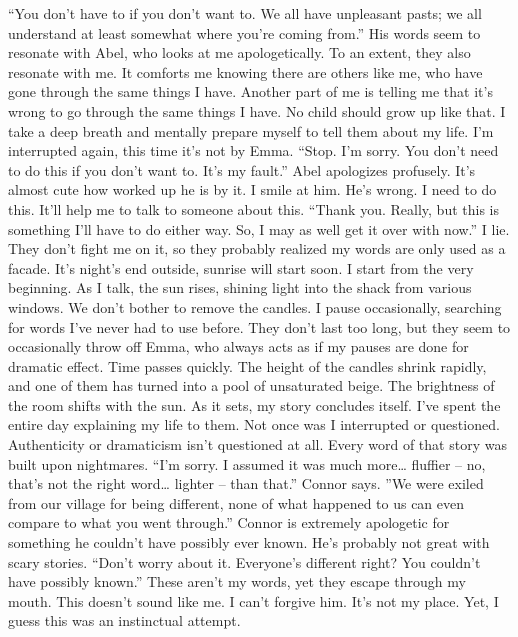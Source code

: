 \documentclass[openany, 12pt]{book}
\newcommand\tab[1][1cm]{\hspace*{#1}}
\begin{document}
\tab
``You don’t have to if you don’t want to. We all have unpleasant pasts; we all understand at least somewhat where you’re coming from.'' His words seem to resonate with Abel, who looks at me apologetically. To an extent, they also resonate with me. It comforts me knowing there are others like me, who have gone through the same things I have. Another part of me is telling me that it’s wrong to go through the same things I have. No child should grow up like that.\newline
\tab
I take a deep breath and mentally prepare myself to tell them about my life. I’m interrupted again, this time it’s not by Emma. ``Stop. I’m sorry. You don’t need to do this if you don’t want to. It’s my fault.'' Abel apologizes profusely. It’s almost cute how worked up he is by it. I smile at him. He’s wrong. I need to do this. It’ll help me to talk to someone about this.\newline
\tab
``Thank you. Really, but this is something I’ll have to do either way. So, I may as well get it over with now.'' I lie. They don’t fight me on it, so they probably realized my words are only used as a facade.\newline
\tab
It’s night’s end outside, sunrise will start soon. I start from the very beginning. As I talk, the sun rises, shining light into the shack from various windows. We don’t bother to remove the candles. I pause occasionally, searching for words I’ve never had to use before. They don’t last too long, but they seem to occasionally throw off Emma, who always acts as if my pauses are done for dramatic effect. Time passes quickly. The height of the candles shrink rapidly, and one of them has turned into a pool of unsaturated beige. The brightness of the room shifts with the sun. As it sets, my story concludes itself. I’ve spent the entire day explaining my life to them. Not once was I interrupted or questioned. Authenticity or dramaticism isn’t questioned at all. Every word of that story was built upon nightmares.\newline
\tab
``I’m sorry. I assumed it was much more… fluffier – no, that’s not the right word… lighter – than that.'' Connor says. ''We were exiled from our village for being different, none of what happened to us can even compare to what you went through.'' Connor is extremely apologetic for something he couldn’t have possibly ever known. He’s probably not great with scary stories.\newline
\tab
``Don’t worry about it. Everyone’s different right? You couldn’t have possibly known.'' These aren’t my words, yet they escape through my mouth. This doesn’t sound like me. I can’t forgive him. It’s not my place. Yet, I guess this was an instinctual attempt.\newline
\end{document}
